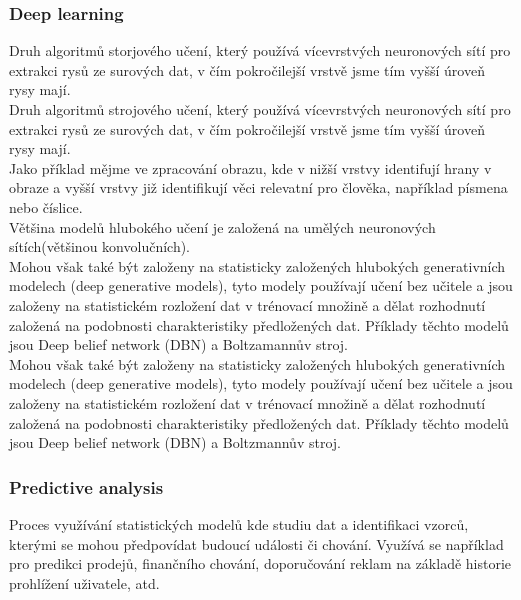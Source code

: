 \subsubsection{Deep learning}
Druh algoritmů storjového učení, který používá vícevrstvých neuronových sítí pro extrakci rysů ze surových dat, v čím pokročilejší vrstvě jsme tím vyšší úroveň rysy mají.\\
Druh algoritmů strojového učení, který používá vícevrstvých neuronových sítí pro extrakci rysů ze surových dat, v čím pokročilejší vrstvě jsme tím vyšší úroveň rysy mají.\\
Jako příklad mějme ve zpracování obrazu, kde v nižší vrstvy identifují hrany v obraze a vyšší vrstvy již identifikují věci relevatní pro člověka, například písmena nebo číslice.\\
Většina modelů hlubokého učení je založená na umělých neuronových sítích(většinou konvolučních).\\
Mohou však také být založeny na statisticky založených hlubokých generativních modelech (deep generative models), tyto modely používají učení bez učitele a jsou založeny na statistickém rozložení dat v trénovací množině a dělat rozhodnutí založená na podobnosti charakteristiky předložených dat. Příklady těchto modelů jsou Deep belief network (DBN) a Boltzamannův stroj.\\
Mohou však také být založeny na statisticky založených hlubokých generativních modelech (deep generative models), tyto modely používají učení bez učitele a jsou založeny na statistickém rozložení dat v trénovací množině a dělat rozhodnutí založená na podobnosti charakteristiky předložených dat. Příklady těchto modelů jsou Deep belief network (DBN) a Boltzmannův stroj.\\
\subsubsection{Predictive analysis}
Proces využívání statistických modelů kde studiu dat a identifikaci vzorců, kterými se mohou předpovídat budoucí události či chování. Využívá se například pro predikci prodejů, finančního chování, doporučování reklam na základě historie prohlížení uživatele, atd.\\

